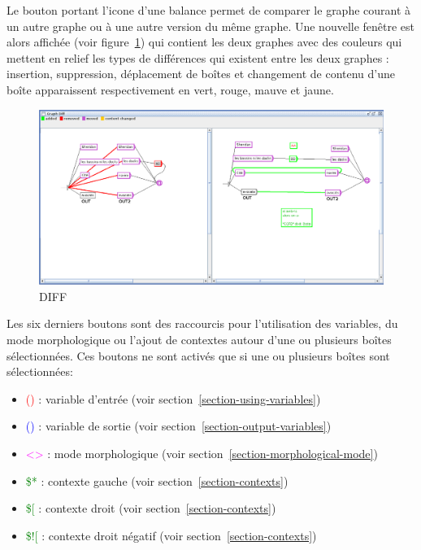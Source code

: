 \bigskip
\noindent Le bouton portant l'icone d'une balance permet de comparer le graphe courant à un autre
graphe ou à une autre version du même graphe. Une nouvelle fenêtre est alors affichée (voir
	figure~\ref{Graph-DIFF}) qui contient les deux graphes avec des couleurs qui mettent en
relief les types de différences qui existent entre les deux graphes : insertion, suppression,
déplacement de boîtes et changement de contenu d'une boîte apparaissent respectivement en vert,
rouge, mauve et jaune.

\bigskip
\noindent 
\begin{figure}[!h]
\begin{center}
\includegraphics[width=15.6cm]{resources/img/DIFF.png}
\caption{DIFF\label{Graph-DIFF}}
\end{center}
\end{figure}
\bigskip
\noindent

Les six derniers boutons sont des raccourcis pour l'utilisation des variables, du mode morphologique
ou l'ajout de contextes autour d'une ou plusieurs boîtes sélectionnées. Ces boutons ne sont activés que si une  ou plusieurs boîtes sont sélectionnées:
\begin{itemize}
\item \textcolor{red}{()}  : variable d'entrée	(voir section~\ref{section-using-variables})
\item \textcolor{blue}{()} : variable de sortie (voir section~\ref{section-output-variables})
\item \textcolor{magenta}{<>} : mode morphologique (voir section~\ref{section-morphological-mode})
\item \textcolor{green}{\$*} : contexte gauche (voir section~\ref{section-contexts})
\item \textcolor{green}{\$[} : contexte droit (voir section~\ref{section-contexts})
\item \textcolor{green}{\$![} : contexte droit négatif (voir section~\ref{section-contexts})
\end{itemize}

